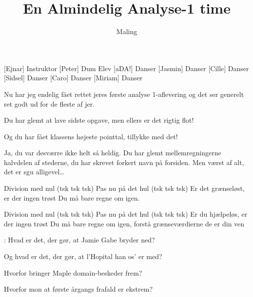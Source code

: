 \documentclass[a4paper,11pt]{article}
\title{En Almindelig Analyse-1 time}
\author{Maling}
\begin{document}
\maketitle

\begin{roles}
[Ejnar] Instruktor
[Peter] Dum Elev
[aDA!] Danser
[Jasmin] Danser
[Cille] Danser
[Sidsel] Danser
[Caro] Danser
[Miriam] Danser
\end{roles}

\begin{song}

 Nu har jeg endelig fået rettet jeres første analyse 1-aflevering og det ser generelt ret godt ud for de fleste af jer.


 Du har glemt at lave sidste opgave, men ellers er det rigtig flot!

 Og du har fået klassens højeste pointtal, tillykke med det!


 Ja, du var desværre ikke helt så heldig. Du har glemt mellemregningerne halvdelen af stederne, du har skrevet forkert navn på forsiden. Men værst af alt, det er sgu alligevel…


 Division med nul (tsk tsk tsk) 
Pas nu på det hul (tsk tsk tsk) 
Er det grænseløst, er der ingen trøst 
Du må bare regne om igen.

 Division med nul (tsk tsk tsk) 
Pas nu på det hul (tsk tsk tsk) 
Er du hjælpeløs, er der ingen trøst 
Du må bare regne om igen, 
forstå grænseværdierne de er din ven


: Hvad er det, der gør, at Jamie Gabe bryder ned?

 Og hvad er det, der gør, at l’Hopital han os’ er med?

 Hvorfor bringer Maple domain-beskeder frem?

 Hvorfor mon at første årgangs frafald er ekstrem?



\end{song}
\end{document}
